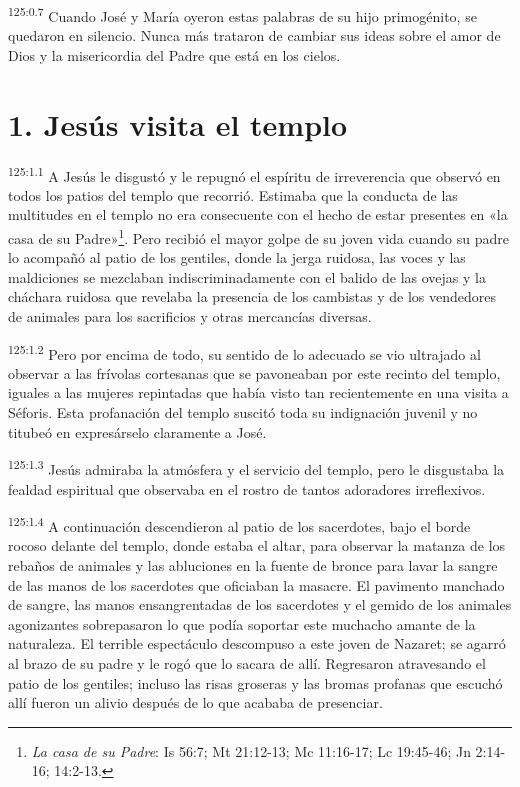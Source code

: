 \par
\textsuperscript{125:0.7} Cuando José y María oyeron estas palabras de su hijo primogénito, se quedaron en silencio. Nunca más trataron de cambiar sus ideas sobre el amor de Dios y la misericordia del Padre que está en los cielos.

\section*{1. Jesús visita el templo}
\par
\textsuperscript{125:1.1} A Jesús le disgustó y le repugnó el espíritu de irreverencia que observó en todos los patios del templo que recorrió. Estimaba que la conducta de las multitudes en el templo no era consecuente con el hecho de estar presentes en «la casa de su Padre»\footnote{\textit{La casa de su Padre}: Is 56:7; Mt 21:12-13; Mc 11:16-17; Lc 19:45-46; Jn 2:14-16; 14:2-13.}. Pero recibió el mayor golpe de su joven vida cuando su padre lo acompañó al patio de los gentiles, donde la jerga ruidosa, las voces y las maldiciones se mezclaban indiscriminadamente con el balido de las ovejas y la cháchara ruidosa que revelaba la presencia de los cambistas y de los vendedores de animales para los sacrificios y otras mercancías diversas.

\par
\textsuperscript{125:1.2} Pero por encima de todo, su sentido de lo adecuado se vio ultrajado al observar a las frívolas cortesanas que se pavoneaban por este recinto del templo, iguales a las mujeres repintadas que había visto tan recientemente en una visita a Séforis. Esta profanación del templo suscitó toda su indignación juvenil y no titubeó en expresárselo claramente a José.

\par
\textsuperscript{125:1.3} Jesús admiraba la atmósfera y el servicio del templo, pero le disgustaba la fealdad espiritual que observaba en el rostro de tantos adoradores irreflexivos.

\par
\textsuperscript{125:1.4} A continuación descendieron al patio de los sacerdotes, bajo el borde rocoso delante del templo, donde estaba el altar, para observar la matanza de los rebaños de animales y las abluciones en la fuente de bronce para lavar la sangre de las manos de los sacerdotes que oficiaban la masacre. El pavimento manchado de sangre, las manos ensangrentadas de los sacerdotes y el gemido de los animales agonizantes sobrepasaron lo que podía soportar este muchacho amante de la naturaleza. El terrible espectáculo descompuso a este joven de Nazaret; se agarró al brazo de su padre y le rogó que lo sacara de allí. Regresaron atravesando el patio de los gentiles; incluso las risas groseras y las bromas profanas que escuchó allí fueron un alivio después de lo que acababa de presenciar.

